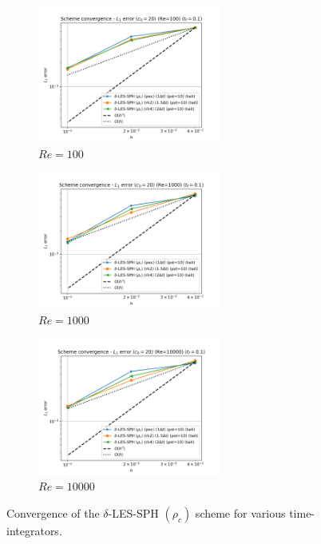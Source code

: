 \begin{figure}[htbp!]
  \begin{subfigure}{7cm}
    \centering\includegraphics[width=6cm]{Code-Figures/deltales/integrator/dt_pois_conv_c0_20_re_100.png}
    \caption{$Re = 100$}
  \end{subfigure}
  \begin{subfigure}{7cm}
    \centering\includegraphics[width=6cm]{Code-Figures/deltales/integrator/dt_pois_conv_c0_20_re_1000.png}
    \caption{$Re = 1000$}
  \end{subfigure}
  \begin{subfigure}{7cm}
    \centering\includegraphics[width=6cm]{Code-Figures/deltales/integrator/dt_pois_conv_c0_20_re_10000.png}
    \caption{$Re = 10000$}
  \end{subfigure}
  \caption{Convergence of the $\delta$-LES-SPH $(\rho_c)$ scheme for various time-integrators.}
  \label{fig:deltales-integrator}
\end{figure}

